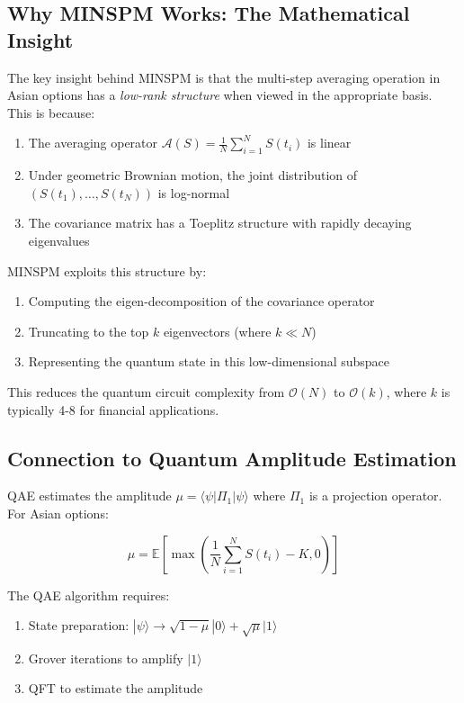 \documentclass[12pt]{article}
\begin{document}
\subsection{Why MINSPM Works: The Mathematical Insight}

The key insight behind MINSPM is that the multi-step averaging operation in Asian options has a \textit{low-rank structure} when viewed in the appropriate basis. This is because:

\begin{enumerate}
    \item The averaging operator $\mathcal{A}(S) = \frac{1}{N}\sum_{i=1}^{N} S(t_i)$ is linear
    \item Under geometric Brownian motion, the joint distribution of $(S(t_1), \dots, S(t_N))$ is log-normal
    \item The covariance matrix has a Toeplitz structure with rapidly decaying eigenvalues
\end{enumerate}

MINSPM exploits this structure by:
\begin{enumerate}
    \item Computing the eigen-decomposition of the covariance operator
    \item Truncating to the top $k$ eigenvectors (where $k \ll N$)
    \item Representing the quantum state in this low-dimensional subspace
\end{enumerate}

This reduces the quantum circuit complexity from $\mathcal{O}(N)$ to $\mathcal{O}(k)$, where $k$ is typically 4-8 for financial applications.

\subsection{Connection to Quantum Amplitude Estimation}

QAE estimates the amplitude $\mu = \langle \psi | \Pi_1 | \psi \rangle$ where $\Pi_1$ is a projection operator. For Asian options:

\begin{equation}
\mu = \mathbb{E}\left[\max\left(\frac{1}{N}\sum_{i=1}^{N} S(t_i) - K, 0\right)\right]
\end{equation}

The QAE algorithm requires:
\begin{enumerate}
    \item State preparation: $| \psi \rangle \to \sqrt{1-\mu}|0\rangle + \sqrt{\mu}|1\rangle$
    \item Grover iterations to amplify $|1\rangle$
    \item QFT to estimate the amplitude
\end{enumerate}
\end{document}
